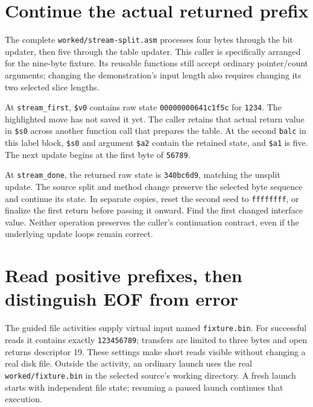 \section{Continue the actual returned prefix}

The complete \texttt{worked/\allowbreak stream-split.asm} processes four bytes
through the bit updater, then five through the table updater. This caller is
specifically arranged for the nine-byte fixture. Its reusable functions still
accept ordinary pointer/count arguments; changing the demonstration's input
length also requires changing its two selected slice lengths.

At \texttt{stream\_first}, \texttt{\$v0} contains raw state
\texttt{00000000641c1f5c} for \texttt{1234}. The highlighted move has not saved
it yet. The caller retains that actual return value in \texttt{\$s0} across
another function call that prepares the table. At the second \texttt{balc} in
this label block, \texttt{\$s0} and argument \texttt{\$a2} contain the retained
state, and \texttt{\$a1} is five. The next update begins at the first byte of
\texttt{56789}.



At \texttt{stream\_done}, the returned raw state is \texttt{340bc6d9}, matching
the unsplit update. The source split and method change preserve the selected
byte sequence and continue its state. In separate copies, reset the second seed
to \texttt{ffffffff}, or finalize the first return before passing it onward.
Find the first changed interface value. Neither operation preserves the caller's
continuation contract, even if the underlying update loops remain correct.

\section{Read positive prefixes, then distinguish EOF from error}

The guided file activities supply virtual input named \texttt{fixture.bin}.
For successful reads it contains exactly \texttt{123456789}; transfers are
limited to three bytes and open returns descriptor 19. These settings make
short reads visible without changing a real disk file. Outside the activity,
an ordinary launch uses the real \texttt{worked/\allowbreak fixture.bin} in
the selected source's working directory. A fresh launch starts with independent
file state; resuming a paused launch continues that execution.

